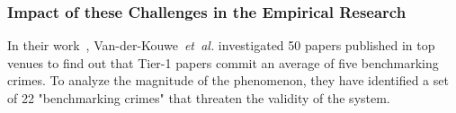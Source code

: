 
\subsubsection{Impact of these Challenges in the Empirical Research}
In their work~\cite{van_der_kouwe_benchmarking_2018}, Van-der-Kouwe~\emph{et~al.} investigated 50 papers published in top venues
to find out that Tier-1 papers commit an average of five benchmarking crimes.
To analyze the magnitude of the phenomenon, they have identified a set of 22 "benchmarking crimes" that threaten the validity of the system.

